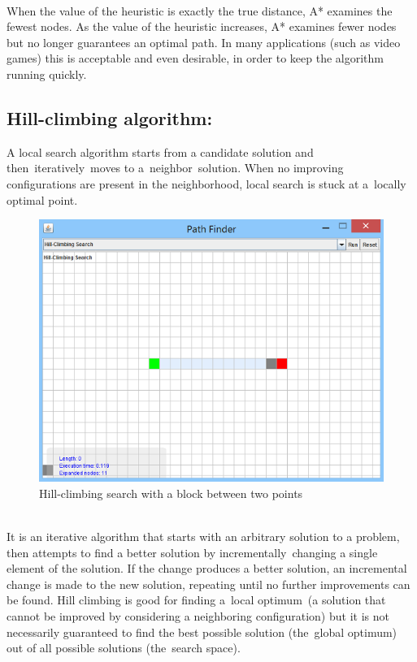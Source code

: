 \documentclass[a4paper]{article}
\begin{document}
\noindent \\
When the value of the heuristic is exactly the true distance, A* examines the fewest nodes. As the value of the heuristic increases, A* examines fewer nodes but no longer guarantees an optimal path. In many applications (such as video games) this is acceptable and even desirable, in order to keep the algorithm running quickly.


\subsection{Hill-climbing algorithm:}

A local search algorithm starts from a candidate solution and then iteratively moves to a neighbor solution. When no improving configurations are present in the neighborhood, local search is stuck at a locally optimal point. \\

\begin{figure}[h!]
  \centering
    \includegraphics[scale=.9]{images/hillclimb1.png}
  \caption{Hill-climbing search with a block between two points}
\end{figure}

\noindent \\
It is an iterative algorithm that starts with an arbitrary solution to a problem, then attempts to find a better solution by incrementally changing a single element of the solution. If the change produces a better solution, an incremental change is made to the new solution, repeating until no further improvements can be found. Hill climbing is good for finding a local optimum (a solution that cannot be improved by considering a neighboring configuration) but it is not necessarily guaranteed to find the best possible solution (the global optimum) out of all possible solutions (the search space).
\end{document}

